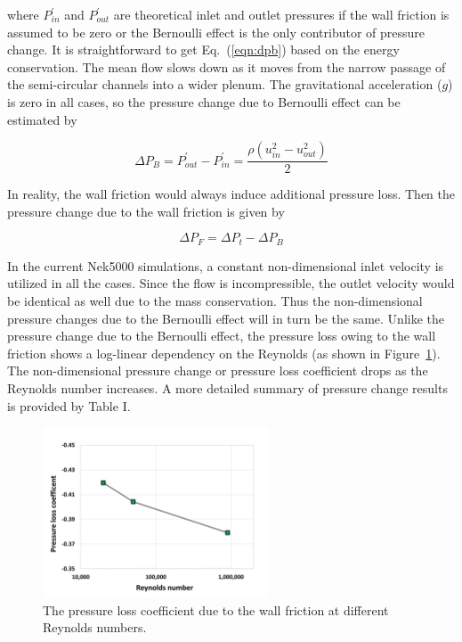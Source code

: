 where $P^\prime_{in}$ and $P^\prime_{out}$ are theoretical inlet and outlet pressures if the wall friction is assumed to be zero or the Bernoulli effect is the only contributor of pressure change.
It is straightforward to get Eq.~(\ref{eqn:dpb}) based on the energy conservation.
The mean flow slows down as it moves from the narrow passage of the semi-circular channels into a wider plenum.
The gravitational acceleration ($g$) is zero in all cases, so the pressure change due to Bernoulli effect can be estimated by 

\begin{equation}
\label{eqn:dpb}
    \Delta P_B = P^\prime_{out} - P^\prime_{in} = \frac{\rho ( u_{in}^2 - u_{out}^2 )}{2} 
\end{equation}

In reality, the wall friction would always induce additional pressure loss.
Then the pressure change due to the wall friction is given by 

\begin{equation}
    \Delta P_F =  \Delta P_t -\Delta P_B
\end{equation}

In the current Nek5000 simulations, a constant non-dimensional inlet velocity is utilized in all the cases.
Since the flow is incompressible, the outlet velocity would be identical as well due to the mass conservation.
Thus the non-dimensional pressure changes due to the Bernoulli effect will in turn be the same.
Unlike the pressure change due to the Bernoulli effect, the pressure loss owing to the wall friction shows a log-linear dependency on the Reynolds (as shown in Figure~\ref{fig:pressure_loss}).
The non-dimensional pressure change or pressure loss coefficient drops as the Reynolds number increases.
A more detailed summary of pressure change results is provided by Table I.


\begin{figure}[!ht]
\centering
\includegraphics[width=0.6\textwidth]{./figures/pressure_loss.png}
\caption{The pressure loss coefficient due to the wall friction at different Reynolds numbers. }
\label{fig:pressure_loss}
\end{figure}


